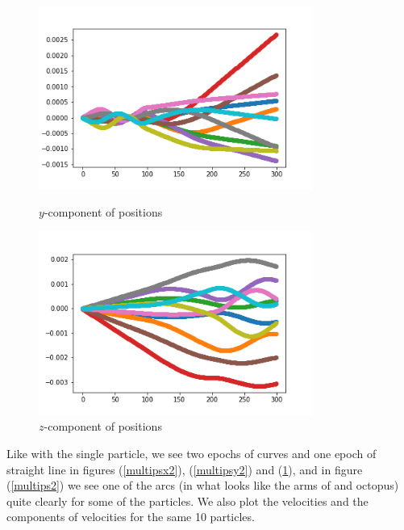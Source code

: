 \documentclass[12pt]{article}
\begin{document}
	\begin{figure}[H]
		\begin{multicols}{2}
			\includegraphics[width=\linewidth, height=6cm]{multipsy2.png} \caption{$y$-component of positions} \label{multipsy2} \par
			\includegraphics[width=\linewidth, height=6cm]{multipsz2.png} \caption{$z$-component of positions} \label{multipsz2} \par
		\end{multicols}
	\end{figure}
	\noindent Like with the single particle, we see two epochs of curves and one epoch of straight line in figures (\ref{multipsx2}), (\ref{multipsy2}) and (\ref{multipsz2}), and in figure (\ref{multips2}) we see one of the arcs (in what looks like the arms of and octopus) quite clearly for some of the particles. We also plot the velocities and the components of velocities for the same 10 particles.
\end{document}
